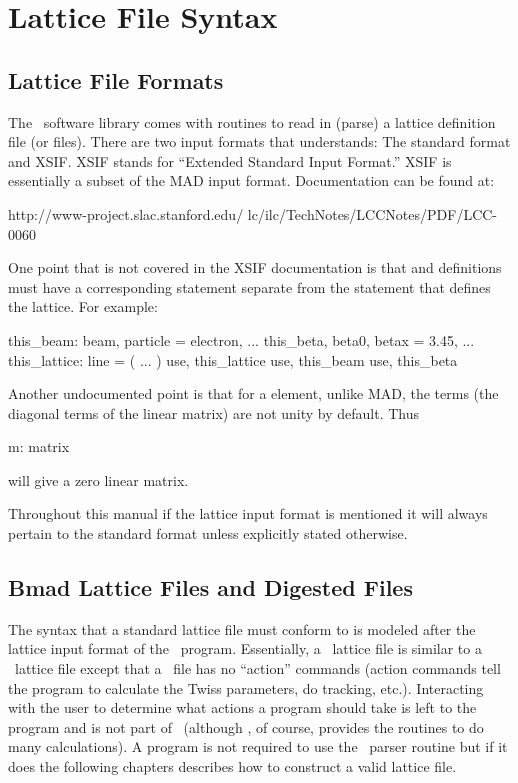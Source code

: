 \chapter{Lattice File Syntax}

\section{Lattice File Formats}
\label{s:lattice_file_formats}

The \bmad\ software library comes with routines to read in (parse) a
lattice definition file (or files). There are two input formats that
\bmad understands: The \bmad standard format and XSIF. XSIF stands for
``Extended Standard Input Format.''  XSIF is essentially a subset of
the MAD input format. Documentation can be found at:
\begin{example}
  http://www-project.slac.stanford.edu/
              lc/ilc/TechNotes/LCCNotes/PDF/LCC-0060%
\end{example}
One point that is not covered in the XSIF documentation is that  and 
 definitions must have a corresponding  statement separate 
from the  statement that defines the lattice. For
example:
\begin{example}
  this_beam: beam, particle = electron, ...
  this_beta, beta0, betax = 3.45, ...
  this_lattice: line = ( ... )
  use, this_lattice
  use, this_beam
  use, this_beta
\end{example}
Another undocumented point is that for a  element, unlike MAD, the
 terms (the diagonal terms of the linear matrix) are not
unity by default. Thus
\begin{example}
  m: matrix
\end{example}
will give a zero linear matrix.

Throughout this manual if the lattice input format is mentioned it
will always pertain to the \bmad standard format unless explicitly
stated otherwise.

\section{Bmad Lattice Files and Digested Files}
\label{s:lattice_files}

The syntax that a \bmad standard lattice file
must conform to is modeled after the lattice input format of the \mad\
program.  Essentially, a \bmad\ lattice file is similar to a \mad\
lattice file except that a \bmad\ file has no ``action'' commands
(action commands tell the program to calculate the Twiss parameters,
do tracking, etc.). 
Interacting with the user to determine what actions a program
should take is left to the program and is not part of \bmad\ (although
\bmad, of course, provides the routines to do many calculations). A
program is not required to use the \bmad\ parser routine but if it
does the following chapters describes how to construct a valid lattice
file.

